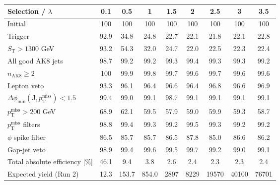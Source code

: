 {\footnotesize\setlength{\tabcolsep}{1.45pt}\renewcommand{\arraystretch}{0.82}%
\begin{tabular}{@{}lcccccccc@{}}
\hline
Selection / $\lambda$ & 0.1 & 0.5 & 1 & 1.5 & 2 & 2.5 & 3 & 3.5 \\
\hline
Initial & 100 & 100 & 100 & 100 & 100 & 100 & 100 & 100 \\
Trigger & 92.9 & 34.8 & 24.8 & 22.7 & 22.1 & 21.8 & 22.1 & 22.8 \\
$S_{\mathrm{T}}>1300$ GeV & 93.2 & 54.3 & 32.0 & 24.7 & 22.0 & 22.5 & 22.3 & 22.4 \\
All good AK8 jets & 98.7 & 99.2 & 99.2 & 99.3 & 99.4 & 99.3 & 99.3 & 99.2 \\
$n_{\mathrm{AK8}}\geq 2$ & 100 & 99.9 & 99.8 & 99.7 & 99.6 & 99.7 & 99.6 & 99.6 \\
Lepton veto & 93.3 & 96.1 & 96.4 & 96.6 & 96.4 & 96.8 & 96.6 & 96.9 \\
$\Delta\phi_{\min}(\mathrm{J},p_{\mathrm{T}}^{\mathrm{miss}})<1.5$ & 99.4 & 99.0 & 99.1 & 98.7 & 99.1 & 99.1 & 99.1 & 99.1 \\
$p_{\mathrm{T}}^{\mathrm{miss}}>200$ GeV & 68.9 & 62.1 & 59.5 & 57.9 & 59.0 & 59.9 & 59.3 & 58.7 \\
$p_{\mathrm{T}}^{\mathrm{miss}}$ filters & 98.8 & 99.4 & 99.3 & 99.2 & 99.5 & 99.3 & 99.2 & 99.2 \\
$\phi$ spike filter & 86.5 & 85.7 & 85.7 & 86.5 & 87.8 & 85.0 & 86.6 & 86.2 \\
Gap-jet veto & 98.9 & 99.4 & 99.6 & 99.5 & 99.7 & 99.2 & 99.0 & 99.1 \\
\hline
Total absolute efficiency [\%] & 46.1 & 9.4 & 3.8 & 2.6 & 2.4 & 2.3 & 2.3 & 2.4 \\
\hline
Expected yield (Run 2) & 12.3 & 153.7 & 854.0 & 2897 & 8229 & 19570 & 40100 & 76701 \\
\hline
\end{tabular}%
}
